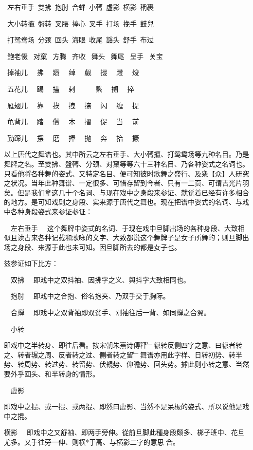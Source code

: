 \documentclass{zhvt-classic}
\begin{document}
~左右垂手~雙拂~抱肘~合蝉~小𨍭~虚影~横影~稱裹 

~大小转攛~盤转~叉腰~捧心~叉手~打场~挽手~鼓兒

~打鸳鸯场~分颈~回头~海眼~收尾~豁头~舒手~布过

~鲍老惙~ 对窠~ 方腾~ 齐收~ 舞头~ 舞尾~ 呈手~ 关宝


~掉袖儿~~ 拂~~ 躜~~ 绰~~ 觑~~ 掇~~ 蹬~~ 焌


~五花儿~~ 踢~~ 搕~~ 剌~~ 𭣇~~ 繫~~ 搠~~ 捽


~雁翅儿~~ 靠~~ 挨~~ 拽~~ 捺~~ 闪~~ 缠~~ 提


~龟背儿~~ 踏~~ 儹~~ 木~~ 摺~~ 促~~ 当~~ 前


~勤蹄儿~~ 摆~~ 磨~~ 捧~~ 抛~~ 奔~~ 抬~~ 撅

以上唐代之舞谱也。其中所云之左右垂手、大小𨍭攛、打鸳鸯场等九种名目。乃是舞牌之名。至雙拂、盤𨍭、分颈、对窠等等六十三种名目、乃各种姿式之名词也。只看他将各种舞的姿式、又特定名目、便可知彼时歌舞之盛行、及衆【众】人研究之状况。当年此种舞谱、一定很多、可惜存留到今者、只有一二页、可谓吉光片羽矣。但是我们拿这几十个名词、与现在戏中之身段来参证、就觉着已经有许多相合的地方。是可知戏剧之身段、实来源于唐代之舞也。现在把谱中姿式的名词、与戏中各种身段姿式来参证参证：

~~左右垂手~~ 这个舞牌中姿式的名词、于现在戏中旦脚出场的各种身段、大致相似且读古来各种记载和歌咏的文字、大致都说这个舞牌子是女子所舞的；则旦脚出场之身段、来源于此也未可知。因旦脚所去的都是女子也。

兹参证如下比方：

~~双拂~~ 即戏中之双抖袖、因拂字之义、舆抖字大致相同也。

~~抱肘~~ 即戏中之合抱、俗名抱夹、乃双手交于胸际。

~~合蝉~~ 即戏中之双背袖即双贫手、刚袖往后一背、如同蝉之合翼。

~~小转~~\begin{preface}
即戏中之半转身、即往后看。按宋朝朱熹诗傅释﹂辗转反侧四字之意、曰辗者转之、转者辗之周、反者转之过、侧者转之留﹂舞谱亦用此字样、日转初势、转半势、转周势、转过势、转留势、伏覩势、仰瞻势、回头势。摢此则小转之意、当然要外乎回头、和半转身的情形。  
\end{preface}

~~虚影~~\begin{preface}
即戏中之掍、或一掍、或两掍、即然曰虚影、当然不是呆板的姿式、所以说他是戏中之掍。
\end{preface}

横影
~~即戏中之又舒袖、即两手旁伸。從前旦脚此種身段颇多、梆子班中、花旦尤多。又手往旁一伸、则横*于高、与横影二字的意思𣑕合。
\end{document}
